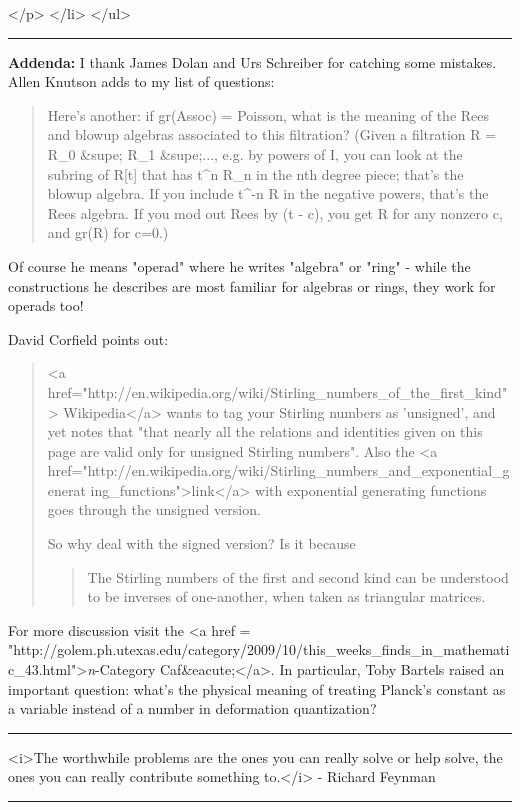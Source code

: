 </p>
</li>
</ul>

\par\noindent\rule{\textwidth}{0.4pt}

\textbf{Addenda:} I thank James Dolan and Urs Schreiber for catching some 
mistakes.  Allen Knutson adds to my list of questions: 

\begin{quote}
   Here's another: if gr(Assoc) = Poisson, what is the meaning of 
   the Rees and blowup algebras associated to this filtration?
   (Given a filtration R = R_{0} &supe; R_{1}
   &supe;..., e.g. by powers of I, you can look at the subring of R[t]
   that has t^{n} R_{n} in the nth degree piece;
   that's the blowup algebra.  If you include t^{-n} R in the negative
   powers, that's the Rees algebra. If you mod out Rees by (t - c),
   you get R for any nonzero c, and gr(R) for c=0.)
\end{quote}

Of course he means "operad" where he writes "algebra" or "ring" - while
the constructions he describes are most familiar for algebras or rings, 
they work for operads too!

David Corfield points out:

\begin{quote}
<a
href="http://en.wikipedia.org/wiki/Stirling_numbers_of_the_first_kind">
Wikipedia</a> wants to tag your Stirling numbers as 'unsigned', and yet notes
that "that nearly all the relations and identities given on this page are
valid only for unsigned Stirling numbers". Also the <a
href="http://en.wikipedia.org/wiki/Stirling_numbers_and_exponential_generat
ing_functions">link</a> with exponential generating functions goes through
the unsigned version.

So why deal with the signed version? Is it because

\begin{quote}

The Stirling numbers of the first and second kind can be understood to be
inverses of one-another, when taken as triangular matrices.

\end{quote}

\end{quote}
For more discussion visit the 
<a href =
"http://golem.ph.utexas.edu/category/2009/10/this_weeks_finds_in_mathematic_43.html">\emph{n}-Category
Caf&eacute;</a>.  In particular, Toby Bartels raised an important
question: what's the physical meaning of treating Planck's constant as
a variable instead of a number in deformation quantization?

\par\noindent\rule{\textwidth}{0.4pt}

<i>The worthwhile problems are the ones you can really solve or help
solve, the ones you can really contribute something to.</i> -
Richard Feynman
\par\noindent\rule{\textwidth}{0.4pt}

